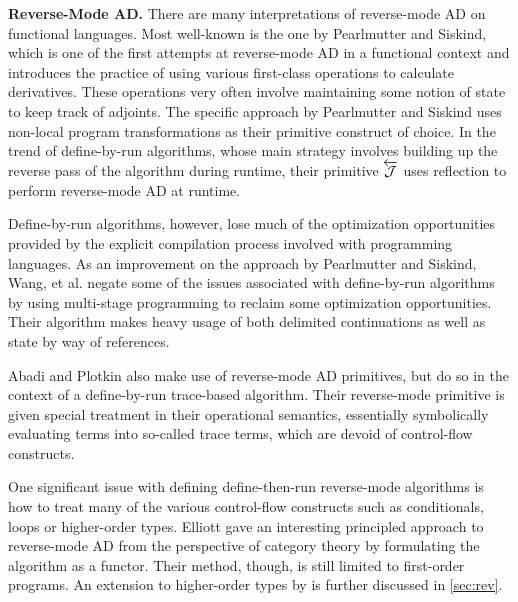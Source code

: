 \textbf{Reverse-Mode AD.} There are many interpretations of reverse-mode AD on functional languages.
Most well-known is the one by Pearlmutter and Siskind\cite{PearlmutterSiskind2008}, which is one of the first attempts at reverse-mode AD in a functional context and introduces the practice of using various first-class operations to calculate derivatives.
These operations very often involve maintaining some notion of state to keep track of adjoints.
The specific approach by Pearlmutter and Siskind uses non-local program transformations as their primitive construct of choice.
In the trend of define-by-run algorithms, whose main strategy involves building up the reverse pass of the algorithm during runtime, their primitive $\overleftarrow{\mathcal{J}}$ uses reflection to perform reverse-mode AD at runtime.

Define-by-run algorithms, however, lose much of the optimization opportunities provided by the explicit compilation process involved with programming languages.
As an improvement on the approach by Pearlmutter and Siskind, Wang, et al.\cite{ShiftReset:Backprop} negate some of the issues associated with define-by-run algorithms by using multi-stage programming to reclaim some optimization opportunities.
Their algorithm makes heavy usage of both delimited continuations as well as state by way of references.

Abadi and Plotkin\cite{10.1145/3371106} also make use of reverse-mode AD primitives, but do so in the context of a define-by-run trace-based algorithm.
Their reverse-mode primitive is given special treatment in their operational semantics, essentially symbolically evaluating terms into so-called trace terms, which are devoid of control-flow constructs.

One significant issue with defining define-then-run reverse-mode algorithms is how to treat many of the various control-flow constructs such as conditionals, loops or higher-order types.
Elliott\cite{Elliott-2018-ad-icfp} gave an interesting principled approach to reverse-mode AD from the perspective of category theory by formulating the algorithm as a functor.
Their method, though, is still limited to first-order programs.
An extension to higher-order types by \Vakar{}\cite{vkr2020reverse} is further discussed in \cref{sec:rev}.

